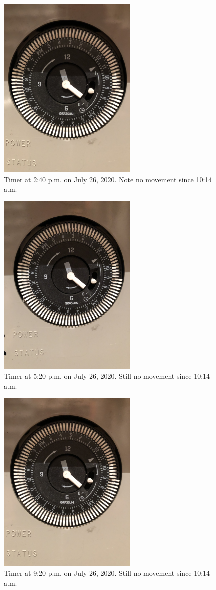 \documentclass[letterpaper,12pt]{texMemo}
\begin{document}
\begin{figure}
  \includegraphics[width=\linewidth,angle=-90,origin=c,height=3.5in]{images/20200726T1440.jpg}
  \caption{Timer at 2:40 p.m. on July 26, 2020. Note no movement since 10:14 a.m.}
  \label{Figure 3}
\end{figure}

\begin{figure}
  \includegraphics[width=\linewidth,angle=-90,origin=c,height=3.5in]{images/20200726T1720.jpg}
  \caption{Timer at 5:20 p.m. on July 26, 2020. Still no movement since 10:14 a.m.}
  \label{Figure 4}
\end{figure}

\begin{figure}
  \includegraphics[width=\linewidth,angle=-90,origin=c,height=3.5in]{images/20200726T2122.jpg}
  \caption{Timer at 9:20 p.m. on July 26, 2020. Still no movement since 10:14 a.m.}
  \label{Figure 5}
\end{figure}
\end{document}
